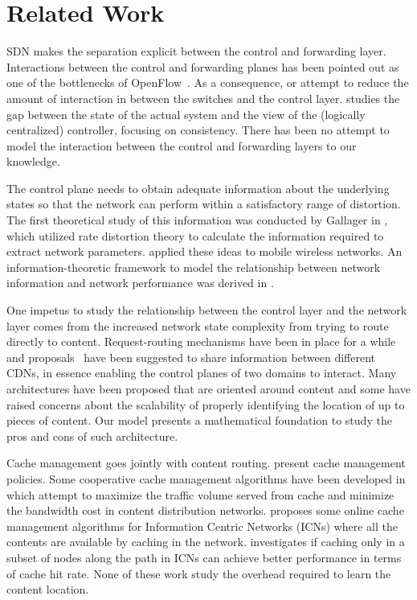 \documentclass[conference]{IEEEtran}
\theoremstyle{plain}
\theoremstyle{remark}
\begin{document}
\section{Related Work}
\label{sec:related}

SDN makes the separation explicit between the control and forwarding layer. Interactions between the control and forwarding planes has been pointed out as one of the bottlenecks of OpenFlow~\cite{McKeown2008OpenFlow}. As a consequence, \cite{Curtis2011Devo} or \cite{Yu2010Difane} attempt to reduce the amount of interaction in between the switches and the control layer. \cite{Levin2012Logically} studies the gap between the state of the actual system and the view of the (logically centralized) controller, focusing on consistency. There has been no attempt to model the interaction between the control and forwarding layers to our knowledge.

The control plane needs to obtain adequate information about the underlying states so that the network can perform within a satisfactory range of distortion. The first theoretical study of this information was conducted by Gallager in \cite{Gallager1976Basic}, which utilized rate distortion theory to calculate the information required to extract network parameters. \cite{Wang2012Cost} applied these ideas to mobile wireless networks. An information-theoretic framework to model the relationship between network information and network performance was derived in \cite{Hong2009Impact}.

One impetus to study the relationship between the control layer and the network layer comes from the increased network state complexity from trying to route directly to content. Request-routing mechanisms have been in place for a while\cite{Barbir2003Requestrouting} and proposals~\cite{Davie2012Framework} have been suggested to share information between different CDNs, in essence enabling the control planes of two domains to interact. Many architectures have been proposed that are oriented around content\cite{Gritter2001Architecture,Koponen2007Dataoriented,Jacobson2009Networking,Zhang2010Named,Pursuit,Ahlgren2012Survey} and some have raised concerns about the scalability of properly identifying the location of up to  pieces of content\cite{Ghodsi2011InformationCentric}. Our model presents a mathematical foundation to study the pros and cons of such architecture.

Cache management goes jointly with content routing. \cite{Tang2008BenefitBased}\cite{Bhattacharjee1998Self}\cite{Cho2012WAVE} present cache management policies. Some cooperative cache management algorithms have been developed in \cite{Borst2010Distributed} which attempt to maximize the traffic volume served from cache and minimize the bandwidth cost in content distribution networks. \cite{Sourlas2012Autonomic} proposes some online cache management algorithms for Information Centric Networks (ICNs) where all the contents are available by caching in the network. \cite{Chai2012Cache} investigates if caching only in a subset of nodes along the path in ICNs can achieve better performance in terms of cache hit rate. None of these work study the overhead required to learn the content location. 
\end{document}
